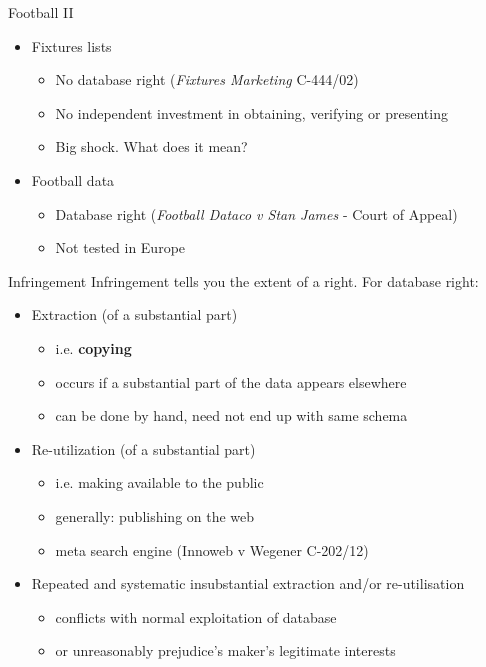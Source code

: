 \documentclass{beamer}
\begin{document}
\begin{frame}{Football II}
  \begin{itemize}
  \item Fixtures lists
    \begin{itemize}
    \item No database right ({\it Fixtures Marketing} C-444/02)
    \item No independent investment in obtaining, verifying or presenting
    \item Big shock. What does it mean?
    \end{itemize}
  \item Football data
    \begin{itemize}
    \item Database right ({\it Football Dataco v Stan James} - Court of Appeal)
    \item Not tested in Europe
    \end{itemize}
  \end{itemize}
  
\end{frame}

\begin{frame}{Infringement}
Infringement tells you the extent of a right. For database right:
  \begin{itemize}
  \item Extraction (of a substantial part)
    \begin{itemize}
    \item i.e. {\bf copying}
    \item occurs if a substantial part of the data appears elsewhere
    \item can be done by hand, need not end up with same schema
    \end{itemize}
  \item Re-utilization (of a substantial part)
    \begin{itemize}
    \item i.e. making available to the public
    \item generally: publishing on the web
    \item meta search engine ({Innoweb v Wegener} C-202/12)
    \end{itemize}
  \item Repeated and systematic insubstantial extraction and/or re-utilisation
    \begin{itemize}
    \item conflicts with normal exploitation of database
    \item or unreasonably prejudice's maker's legitimate interests
    \end{itemize}
  \end{itemize}
\end{frame}
\end{document}
